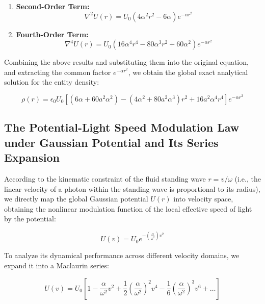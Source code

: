 \documentclass[12pt, a4paper]{article}
\begin{document}
\begin{enumerate}
    \item \textbf{Second-Order Term:}
    \begin{equation}
    \nabla^2 U(r) = U_0 (4\alpha^2 r^2 - 6\alpha) e^{-\alpha r^2}
    \end{equation}
    \item \textbf{Fourth-Order Term:}
    \begin{equation}
    \nabla^4 U(r) = U_0 (16\alpha^4 r^4 - 80\alpha^3 r^2 + 60\alpha^2) e^{-\alpha r^2}
    \end{equation}
\end{enumerate}

Combining the above results and substituting them into the original equation, and extracting the common factor $e^{-\alpha r^2}$, we obtain the global exact analytical solution for the entity density:

\begin{equation}
\rho(r) = \epsilon_0 U_0 \left[ (6\alpha + 60a^2\alpha^2) - (4\alpha^2 + 80a^2\alpha^3)r^2 + 16a^2\alpha^4 r^4 \right] e^{-\alpha r^2}
\end{equation}

\subsection{The Potential-Light Speed Modulation Law under Gaussian Potential and Its Series Expansion}

According to the kinematic constraint of the fluid standing wave $r = v/\omega$ (i.e., the linear velocity of a photon within the standing wave is proportional to its radius), we directly map the global Gaussian potential $U(r)$ into velocity space, obtaining the nonlinear modulation function of the local effective speed of light by the potential:

\begin{equation}
U(v) = U_0 e^{-\left( \frac{\alpha}{\omega^2} \right) v^2}
\end{equation}

To analyze its dynamical performance across different velocity domains, we expand it into a Maclaurin series:

\begin{equation}
U(v) = U_0 \left[ 1 - \frac{\alpha}{\omega^2} v^2 + \frac{1}{2} \left( \frac{\alpha}{\omega^2} \right)^2 v^4 - \frac{1}{6} \left( \frac{\alpha}{\omega^2} \right)^3 v^6 + \dots \right]
\end{equation}
\end{document}

